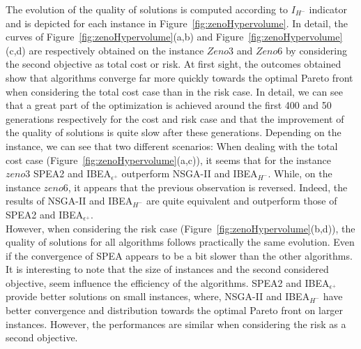 \documentclass{llncs}
\begin{document}
The evolution of the quality of solutions is computed according to $I_{H^-}$ indicator and is depicted for each instance in Figure~\ref{fig:zenoHypervolume}.
In detail, the curves of Figure~\ref{fig:zenoHypervolume}(a,b) and Figure~\ref{fig:zenoHypervolume}(c,d) are 
respectively obtained on the instance $Zeno3$ and $Zeno6$ by considering the second objective as total cost or risk.
At first sight, the outcomes obtained show that algorithms converge far more quickly towards the optimal Pareto front  when considering the
total cost case than in the risk case.
In detail, we can see that a great part of the optimization is achieved around the first 400  and 50 generations respectively for the cost and risk case and that the improvement of the quality of solutions is quite slow after these generations.
Depending on the instance, we can see that two different scenarios:
When dealing with the total cost case (Figure~\ref{fig:zenoHypervolume}(a,c)), it seems that for the instance $zeno3$ SPEA2 and IBEA$_{\epsilon^+}$ outperform NSGA-II and IBEA$_{H^-}$.
While, on the instance $zeno6$, it appears that the previous observation is reversed. Indeed, the results of NSGA-II and IBEA$_{H^-}$ are quite equivalent
and outperform those of SPEA2 and IBEA$_{\epsilon^+}$.\\
However, when considering the risk case (Figure~\ref{fig:zenoHypervolume}(b,d)), the quality of solutions  for all algorithms 
follows practically the same evolution. Even if the  convergence of SPEA appears to be a bit slower than the other algorithms.
It is interesting to note that the size of instances  and the  second  considered objective, seem  influence the efficiency of the algorithms.
SPEA2 and IBEA$_{\epsilon^+}$  provide  better solutions on small instances,  where, NSGA-II and IBEA$_{H^-}$ have better convergence and distribution  towards the optimal Pareto front on 
larger instances. However, the performances are similar when considering the risk as a second objective.
\end{document}
